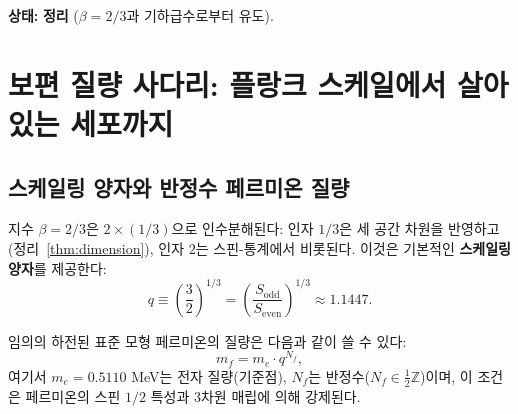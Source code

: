 \documentclass[12pt,a4paper]{article}
\begin{document}
	\textbf{상태:} \textbf{정리} (\(\beta = 2/3\)과 기하급수로부터 유도).
	
	\section{보편 질량 사다리: 플랑크 스케일에서 살아있는 세포까지}
	\label{sec:mass-ladder}
	
	\subsection{스케일링 양자와 반정수 페르미온 질량}
	
	지수 \(\beta = 2/3\)은 \(2 \times (1/3)\)으로 인수분해된다: 인자 \(1/3\)은 세 공간 차원을 반영하고(정리~\ref{thm:dimension}), 인자 \(2\)는 스핀-통계에서 비롯된다. 이것은 기본적인 \textbf{스케일링 양자}를 제공한다:
	\begin{equation}
		q \equiv \left(\frac{3}{2}\right)^{1/3} = \left(\frac{S_{\mathrm{odd}}}{S_{\mathrm{even}}}\right)^{1/3} \approx 1.1447.
	\end{equation}
	
	임의의 하전된 표준 모형 페르미온의 질량은 다음과 같이 쓸 수 있다:
	\begin{equation}
		\boxed{m_f = m_e \cdot q^{N_f}},
		\label{eq:mass-quantization}
	\end{equation}
	여기서 \(m_e = 0.5110\) MeV는 전자 질량(기준점), \(N_f\)는 반정수(\(N_f \in \frac{1}{2}\mathbb{Z}\))이며, 이 조건은 페르미온의 스핀 \(1/2\) 특성과 3차원 매립에 의해 강제된다.
	
\end{document}
